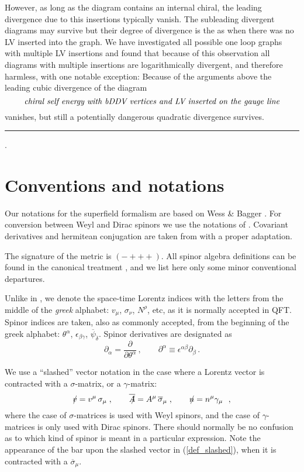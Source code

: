 \documentclass[12pt]{revtex4}
\newcommand{\slashed}[1]{\hbox{{$#1$}\llap{$/$}}}
\begin{document}
However, as long as the diagram contains an internal chiral, the
leading divergence due to this insertions typically vanish. The
subleading divergent diagrams may survive but their degree of
divergence is the as when there was no LV inserted into the graph. 
We have investigated all possible one loop graphs with multiple LV
insertions and found that because of this observation all diagrams
with multiple insertions are logarithmically divergent, and therefore
harmless, with one notable exception: Because of the arguments above
the leading cubic divergence of the diagram 
\begin{equation}
\mbox{\em chiral self energy with bDDV vertices and LV inserted on the
gauge line}
\label{QuadraticRunning}
\end{equation} 
vanishes, but still a potentially dangerous quadratic divergence survives. 
\\\hrule{.}\\ 

\section{Conventions and notations}
\label{app_conventions}

Our notations for the superfield formalism are based on 
Wess \& Bagger 
\cite{Wess:1992cp}.
For conversion between Weyl and Dirac spinors we use the notations
of 
\cite{Martin:1997ns}.
Covariant derivatives and hermitean conjugation are taken from
\cite{Gates:1983nr}
with a proper adaptation.

The signature of the metric is 
$ (-+++) $.
All spinor algebra definitions can be found in the canonical treatment
\cite{Wess:1992cp},
and we list here only some minor conventional departures.

Unlike in \cite{Wess:1992cp}, we denote the space-time Lorentz
indices with the letters from the middle of the \emph{greek}
alphabet:
$ v_\mu $, $ \sigma_\nu $, $ N^\rho $, etc,
as it is normally accepted in QFT.
Spinor indices are taken, also as commonly accepted, from the
beginning of the greek alphabet:
$ \theta^\alpha $, $ \epsilon_{\beta\gamma} $, 
$ \overline{\psi}_{\dot\delta}$.
Spinor derivatives are designated as
\[
\partial_\alpha = \frac{\partial}{\partial\theta^\alpha}\,,
\qquad
\partial^\alpha \equiv \epsilon^{\alpha\beta}\partial_\beta
\,.
\]

We use a ``slashed'' vector notation in the case where a Lorentz
vector is contracted with a $ \sigma $-matrix, or a $ \gamma $-matrix:
\begin{equation}
\label{def_slashed}
\slashed{v} = v^\mu\, \sigma_\mu\;, \qquad
\overline{\slashed{A}} = A^\mu\, \overline{\sigma}_\mu\;, \qquad
\slashed{n} = n^\mu \gamma_\mu~~,
\end{equation}
where the case of $ \sigma $-matrices is used with Weyl spinors, and
the case of $ \gamma $-matrices is only used with Dirac spinors. 
There should normally be no confusion as to which kind of spinor is
meant in a particular expression.
Note the appearance of the bar upon the slashed vector in
(\ref{def_slashed}), when it
is contracted with a $ \overline{\sigma}_\mu $.
\end{document}

